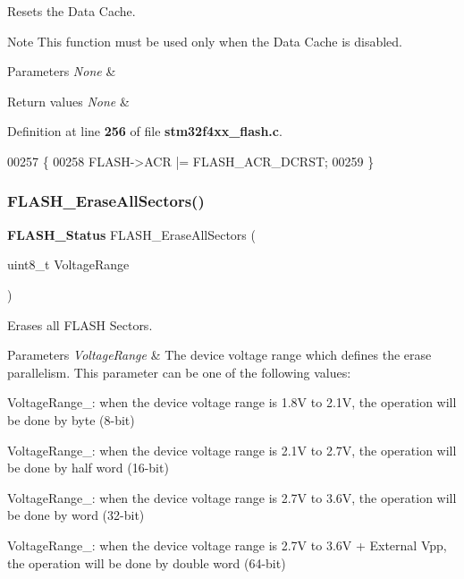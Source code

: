 Resets the Data Cache. 

\begin{DoxyNote}{Note}
This function must be used only when the Data Cache is disabled. 
\end{DoxyNote}

\begin{DoxyParams}{Parameters}
{\em None} & \\
\hline
\end{DoxyParams}

\begin{DoxyRetVals}{Return values}
{\em None} & \\
\hline
\end{DoxyRetVals}


Definition at line \textbf{ 256} of file \textbf{ stm32f4xx\+\_\+flash.\+c}.


\begin{DoxyCode}
00257 \{
00258   FLASH->ACR |= FLASH_ACR_DCRST;
00259 \}
\end{DoxyCode}
\mbox{\label{group__FLASH_ga2aee006e5f4db4280bdedd401dfa50f9}} 
\subsubsection{F\+L\+A\+S\+H\+\_\+\+Erase\+All\+Sectors()}
{\footnotesize\ttfamily \textbf{ F\+L\+A\+S\+H\+\_\+\+Status} F\+L\+A\+S\+H\+\_\+\+Erase\+All\+Sectors (\begin{DoxyParamCaption}\item[{uint8\+\_\+t}]{Voltage\+Range }\end{DoxyParamCaption})}



Erases all F\+L\+A\+SH Sectors. 


\begin{DoxyParams}{Parameters}
{\em Voltage\+Range} & The device voltage range which defines the erase parallelism. This parameter can be one of the following values\+: \begin{DoxyItemize}
\item Voltage\+Range\+\_\+: when the device voltage range is 1.\+8V to 2.\+1V, the operation will be done by byte (8-\/bit) \item Voltage\+Range\+\_\+: when the device voltage range is 2.\+1V to 2.\+7V, the operation will be done by half word (16-\/bit) \item Voltage\+Range\+\_\+: when the device voltage range is 2.\+7V to 3.\+6V, the operation will be done by word (32-\/bit) \item Voltage\+Range\+\_\+: when the device voltage range is 2.\+7V to 3.\+6V + External Vpp, the operation will be done by double word (64-\/bit)\end{DoxyItemize}
\\
\hline
\end{DoxyParams}

